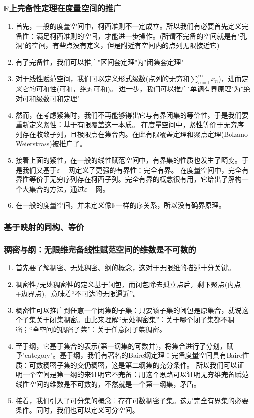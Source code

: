 \documentclass[a4paper, 12pt]{ctexart}
\begin{document}
\subsubsection{$\mathbb{R}$上完备性定理在度量空间的推广}
\begin{enumerate}
    \item 首先，一般的度量空间中，柯西准则不一定成立。所以我们有必要首先定义完备性：满足柯西准则的空间，才能进一步操作。(所谓不完备的空间就是有"孔洞"的空间，有些点没有定义，但是附近有空间内的点列无限接近它)
    \item 有了完备性，我们可以推广"区间套定理"为"闭集套定理"
    \item 对于线性赋范空间，我们可以定义形式级数(点列的无穷和$\sum_{n=1}^\infty x_n$)，进而定义它的可和性(可和，绝对可和)。
    进一步，我们可以推广"单调有界原理"为"绝对可和级数可和定理"
    \item 然而，在考虑紧集时，我们不再能够得出它与有界闭集的等价性。于是我们要重新定义紧性：基于有限覆盖这一本质。
    在度量空间中，紧性等价于无穷序列存在收敛子列，且极限点在集合内。在此有限覆盖定理和聚点定理(Bolzano-Weierstrass)被推广了。
    \item 接着上面的紧性，在一般的线性赋范空间中，有界集的性质也发生了畸变。于是我们又基于$\varepsilon-\text{网}$定义了更强的有界性：完全有界。
    在度量空间中，完全有界性等价于无穷序列存在柯西子列。完全有界的概念很有用，它给出了解构一个大集合的方法，通过$\varepsilon-\text{网}$。
    \item 在一般的度量空间，并未定义像$\mathbb{R}$一样的序关系，所以没有确界原理。
\end{enumerate}
\subsubsection{基于映射的同构、等价}

\subsubsection{稠密与纲：无限维完备线性赋范空间的维数是不可数的}
\begin{enumerate}
    \item 首先要了解稠密、无处稠密、纲的概念，这对于无限维的描述十分关键。
    \item 稠密性/无处稠密性的定义基于闭包，而闭包除去孤立点后，剩下聚点(内点+边界点)，意味着“不可达的无限逼近”。
    \item 稠密性可以推广到任意一个闭集的子集：只要该子集的闭包是原集合，就说这个子集关于闭集稠密。由此来理解“无处稠密集”：关于哪个闭子集都不稠密；“全空间的稠密子集”：关于任意闭子集稠密。
    \item 至于纲，它基于集合的表示(第一纲集的可数并)，将集合进行了分划，赋予"category"。基于纲，我们有著名的Baire纲定理：完备度量空间具有Baire性质：可数稠密子集的交仍稠密，这是第二纲集的充分条件。
    所以我们可以证明一个空间是第一纲的来证明它不完备：用这个思路可以证明无穷维完备赋范线性空间的维数是不可数的，不然就是一个第一纲集，矛盾。
    \item 接着，我们引入了可分集的概念：存在可数稠密子集。这是完全有界集的必要条件。同时，我们也可以定义可分空间。
\end{enumerate}
\end{document}
